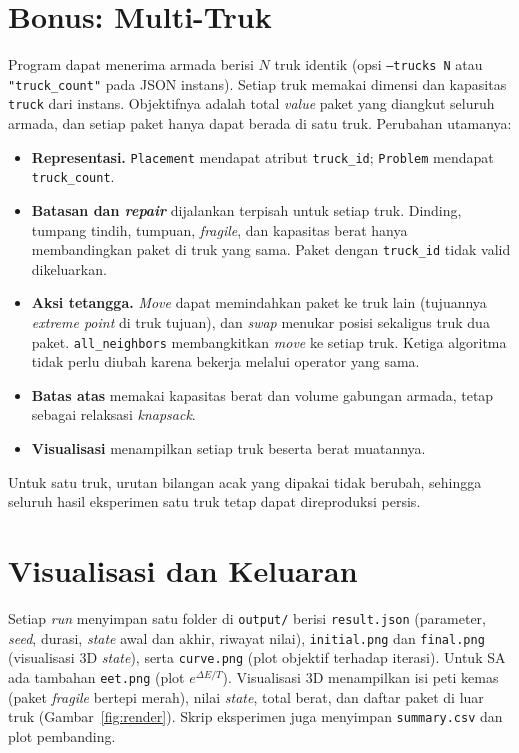 \section{Bonus: Multi-Truk}
\label{sec:multitruck-impl}

Program dapat menerima armada berisi $N$ truk identik (opsi \texttt{--trucks N} atau
\texttt{"truck\_count"} pada JSON instans). Setiap truk memakai dimensi dan kapasitas
\texttt{truck} dari instans. Objektifnya adalah total \textit{value} paket yang
diangkut seluruh armada, dan setiap paket hanya dapat berada di satu truk.
Perubahan utamanya:
\begin{itemize}
	\item \textbf{Representasi.} \texttt{Placement} mendapat atribut \texttt{truck\_id};
	\texttt{Problem} mendapat \texttt{truck\_count}.
	\item \textbf{Batasan dan \textit{repair}} dijalankan terpisah untuk setiap truk.
	Dinding, tumpang tindih, tumpuan, \textit{fragile}, dan kapasitas berat hanya
	membandingkan paket di truk yang sama. Paket dengan \texttt{truck\_id} tidak valid
	dikeluarkan.
	\item \textbf{Aksi tetangga.} \textit{Move} dapat memindahkan paket ke truk lain
	(tujuannya \textit{extreme point} di truk tujuan), dan \textit{swap} menukar posisi
	sekaligus truk dua paket. \texttt{all\_neighbors} membangkitkan \textit{move} ke
	setiap truk. Ketiga algoritma tidak perlu diubah karena bekerja melalui operator
	yang sama.
	\item \textbf{Batas atas} memakai kapasitas berat dan volume gabungan armada,
	tetap sebagai relaksasi \textit{knapsack}.
	\item \textbf{Visualisasi} menampilkan setiap truk beserta berat muatannya.
\end{itemize}
Untuk satu truk, urutan bilangan acak yang dipakai tidak berubah, sehingga seluruh
hasil eksperimen satu truk tetap dapat direproduksi persis.



\section{Visualisasi dan Keluaran}

Setiap \textit{run} menyimpan satu folder di \texttt{output/} berisi
\texttt{result.json} (parameter, \textit{seed}, durasi, \textit{state} awal dan akhir,
riwayat nilai), \texttt{initial.png} dan \texttt{final.png} (visualisasi 3D
\textit{state}), serta \texttt{curve.png} (plot objektif terhadap iterasi). Untuk SA
ada tambahan \texttt{eet.png} (plot $e^{\Delta E/T}$). Visualisasi 3D menampilkan isi
peti kemas (paket \textit{fragile} bertepi merah), nilai \textit{state}, total berat,
dan daftar paket di luar truk (Gambar~\ref{fig:render}). Skrip eksperimen juga
menyimpan \texttt{summary.csv} dan plot pembanding.

